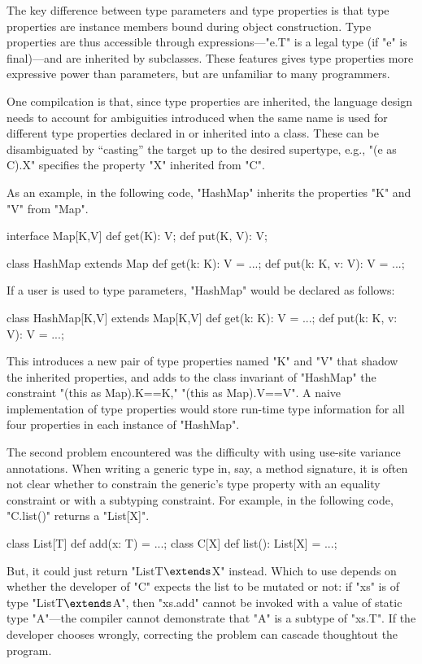 The key difference between type parameters and type properties
is that type properties are
instance members bound during object construction.  Type
properties are thus accessible through expressions---\xcd"e.T" is
a legal type (if \xcd"e" is final)---and are inherited by subclasses.
These features gives type properties more expressive power than
parameters, but are unfamiliar to many programmers.

One compilcation is that,
since type properties are inherited, the language design needs
to account for ambiguities introduced when the same name is
used for different type properties declared in or inherited into a class.
These can be disambiguated
by ``casting'' the target up to the desired supertype,
e.g., \xcd"(e as C).X" specifies
the property \xcd"X" inherited from \xcd"C".

As an example, in the following \Xten code, \xcd"HashMap" 
inherits the properties \xcd"K" and \xcd"V" from \xcd"Map".
\begin{xten}
interface Map[K,V] {
  def get(K): V;
  def put(K, V): V;
}

class HashMap extends Map {
  def get(k: K): V = ...;
  def put(k: K, v: V): V = ...;
}
\end{xten}
If a user is used to type parameters, \xcd"HashMap" would be
declared as follows:
\begin{xten}
class HashMap[K,V] extends Map[K,V] {
  def get(k: K): V = ...;
  def put(k: K, v: V): V = ...;
}
\end{xten}
This introduces a new pair of type properties named \xcd"K" and
\xcd"V" that shadow the inherited properties,
and adds to the class invariant of \xcd"HashMap" the constraint
\xcd"{(this as Map).K==K," \xcd"(this as Map).V==V}".
A naive implementation of type properties would store run-time
type information for all four properties in each instance
of \xcd"HashMap".

\ifwild
The second problem encountered was the difficulty with using use-site
variance annotations.
When writing a generic type in, say, a method signature, it is often not 
clear whether to constrain the generic's type property with an
equality constraint or with a subtyping constraint.
For example, in the following code, \xcd"C.list()" returns a \xcd"List[X]".
\begin{xtenmath}
class List[T] {
  def add(x: T) = ...;
}
class C[X] {
  def list(): List[X] = ...;
}
\end{xtenmath}
\noindent
But, it could just return
\xcdmath"List{T$\extends$X}" instead.
Which to use depends on whether the developer of \xcd"C"
expects the list to be mutated or not: if \xcd"xs"
is of type
\xcdmath"List{T$\extends$A}", then \xcd"xs.add" cannot be
invoked with a value of static type \xcd"A"---the compiler
cannot demonstrate that \xcd"A" is a subtype of \xcd"xs.T".
If the developer chooses wrongly, correcting the problem can
cascade thoughtout the program.
\fi

